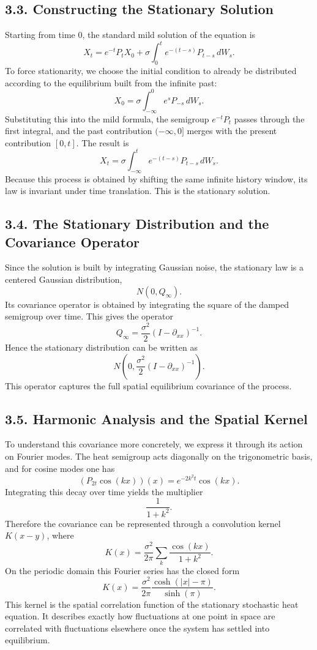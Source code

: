 \documentclass[11pt]{article}
\theoremstyle{definition}
\theoremstyle{remark}
\begin{document}
\subsection*{3.3. Constructing the Stationary Solution}
Starting from time \(0\), the standard mild solution of the equation is
\[
X_t=e^{-t}P_tX_0+\sigma\int_0^t e^{-(t-s)}P_{t-s}\,dW_s.
\]
To force stationarity, we choose the initial condition to already be distributed according to the equilibrium built from the infinite past:
\[
X_0=\sigma\int_{-\infty}^0 e^sP_{-s}\,dW_s.
\]
Substituting this into the mild formula, the semigroup \(e^{-t}P_t\) passes through the first integral, and the past contribution \((-\infty,0]\) merges with the present contribution \([0,t]\). The result is
\[
X_t
=
\sigma\int_{-\infty}^t e^{-(t-s)}P_{t-s}\,dW_s.
\]
Because this process is obtained by shifting the same infinite history window, its law is invariant under time translation. This is the stationary solution.

\subsection*{3.4. The Stationary Distribution and the Covariance Operator}
Since the solution is built by integrating Gaussian noise, the stationary law is a centered Gaussian distribution,
\[
N(0,Q_\infty).
\]
Its covariance operator is obtained by integrating the square of the damped semigroup over time. This gives the operator
\[
Q_\infty
=
\frac{\sigma^2}{2}(I-\partial_{xx})^{-1}.
\]
Hence the stationary distribution can be written as
\[
N\left(0,\frac{\sigma^2}{2}(I-\partial_{xx})^{-1}\right).
\]
This operator captures the full spatial equilibrium covariance of the process.

\subsection*{3.5. Harmonic Analysis and the Spatial Kernel}
To understand this covariance more concretely, we express it through its action on Fourier modes. The heat semigroup acts diagonally on the trigonometric basis, and for cosine modes one has
\[
(P_{2t}\cos(kx))(x)=e^{-2k^2t}\cos(kx).
\]
Integrating this decay over time yields the multiplier
\[
\frac{1}{1+k^2}.
\]
Therefore the covariance can be represented through a convolution kernel \(K(x-y)\), where
\[
K(x)
=
\frac{\sigma^2}{2\pi}
\sum_{k}\frac{\cos(kx)}{1+k^2}.
\]
On the periodic domain this Fourier series has the closed form
\[
K(x)=\frac{\sigma^2}{2\pi}\frac{\cosh(|x|-\pi)}{\sinh(\pi)}.
\]
This kernel is the spatial correlation function of the stationary stochastic heat equation. It describes exactly how fluctuations at one point in space are correlated with fluctuations elsewhere once the system has settled into equilibrium.
\end{document}
